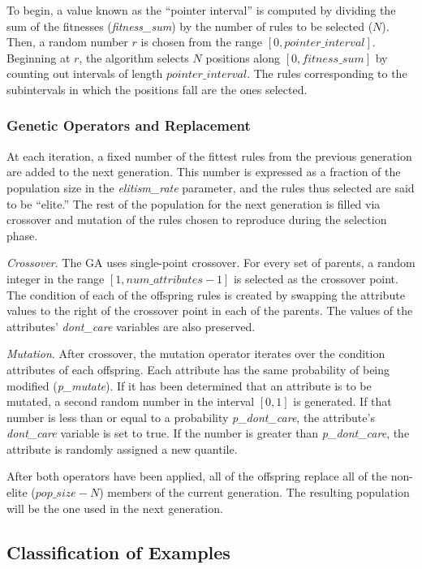 \documentclass[11pt]{article}
\begin{document}
To begin, a value known as the ``pointer interval'' is computed by dividing the sum of the fitnesses (\emph{fitness\_sum}) by the number of rules to be selected ($N$). Then, a random number $r$ is chosen from the range $[0, pointer\_interval]$. Beginning at $r$, the algorithm selects $N$ positions along $[0, fitness\_sum]$ by counting out intervals of length $pointer\_interval$. The rules corresponding to the subintervals in which the positions fall are the ones selected.

\subsubsection{Genetic Operators and Replacement}

At each iteration, a fixed number of the fittest rules from the previous generation are added to the next generation. This number is expressed as a fraction of the population size in the \emph{elitism\_rate} parameter, and the rules thus selected are said to be ``elite.'' The rest of the population for the next generation is filled via crossover and mutation of the rules chosen to reproduce during the selection phase.

\emph{Crossover}. The GA uses single-point crossover. For every set of parents, a random integer in the range $[1, num\_attributes - 1]$ is selected as the crossover point. The condition of each of the offspring rules is created by swapping the attribute values to the right of the crossover point in each of the parents. The values of the attributes' \emph{dont\_care} variables are also preserved.

\emph{Mutation}. After crossover, the mutation operator iterates over the condition attributes of each offspring. Each attribute has the same probability of being modified (\emph{p\_mutate}). If it has been determined that an attribute is to be mutated, a second random number in the interval $[0,1]$ is generated. If that number is less than or equal to a probability \emph{p\_dont\_care}, the attribute's \emph{dont\_care} variable is set to true. If the number is greater than \emph{p\_dont\_care}, the attribute is randomly assigned a new quantile.

After both operators have been applied, all of the offspring replace all of the non-elite ($pop\_size - N$) members of the current generation. The resulting population will be the one used in the next generation.

\subsection{Classification of Examples}
\end{document}
